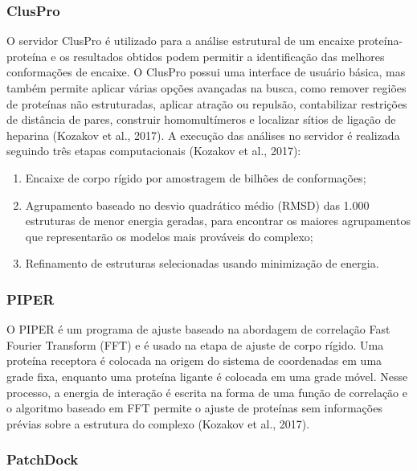 \documentclass[11pt, letterpaper, portuguese]{article}
\begin{document}
\newpage

\subsubsection{ClusPro} %

\par{O servidor ClusPro é utilizado para a análise estrutural de um encaixe proteína-proteína e os resultados obtidos podem permitir a identificação das melhores conformações de encaixe. O ClusPro possui uma interface de usuário básica, mas também permite aplicar várias opções avançadas na busca, como remover regiões de proteínas não estruturadas, aplicar atração ou repulsão, contabilizar restrições de distância de pares, construir homomultímeros e localizar sítios de ligação de heparina (Kozakov et al., 2017). A execução das análises no servidor é realizada seguindo três etapas computacionais (Kozakov et al., 2017):} 

\begin{enumerate}
    \item Encaixe de corpo rígido por amostragem de bilhões de conformações;
    \item Agrupamento baseado no desvio quadrático médio (RMSD) das 1.000 estruturas de menor energia geradas, para encontrar os maiores agrupamentos que representarão os modelos mais prováveis ​​do complexo;
    \item Refinamento de estruturas selecionadas usando minimização de energia.
\end{enumerate}

\subsubsection{PIPER}

\par{O PIPER é um programa de ajuste baseado na abordagem de correlação Fast Fourier Transform (FFT) e é usado na etapa de ajuste de corpo rígido. Uma proteína receptora é colocada na origem do sistema de coordenadas em uma grade fixa, enquanto uma proteína ligante é colocada em uma grade móvel. Nesse processo, a energia de interação é escrita na forma de uma função de correlação e o algoritmo baseado em FFT permite o ajuste de proteínas sem informações prévias sobre a estrutura do complexo (Kozakov et al., 2017).}

\subsubsection{PatchDock}
\end{document}
